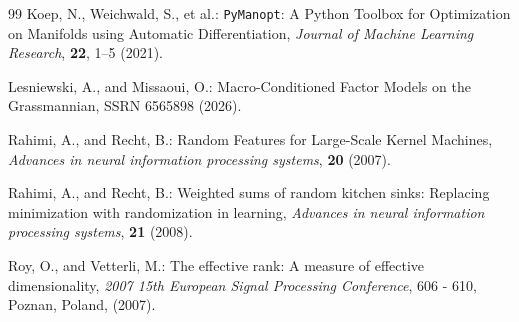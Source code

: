\documentclass[11pt,letterpaper]{article}
\begin{document}
\begin{thebibliography}{99}
 Koep, N., Weichwald, S., et al.: \texttt{PyManopt}: A Python Toolbox for Optimization on Manifolds using Automatic Differentiation, {\em Journal of Machine Learning Research}, \textbf{22}, 1--5 (2021).

 Lesniewski, A., and Missaoui, O.: Macro-Conditioned Factor Models on the Grassmannian, SSRN 6565898 (2026).

 Rahimi, A., and Recht, B.: Random Features for Large-Scale Kernel Machines, \textit{Advances in neural information processing systems}, \textbf{20} (2007).

 Rahimi, A., and Recht, B.: Weighted sums of random kitchen sinks: Replacing minimization with randomization in learning, \textit{Advances in neural information processing systems}, \textbf{21} (2008).

 Roy, O., and Vetterli, M.: The effective rank: A measure of effective dimensionality, \emph{2007 15th European Signal Processing Conference}, 606 - 610, Poznan, Poland, (2007).

\end{thebibliography}
\end{document}
